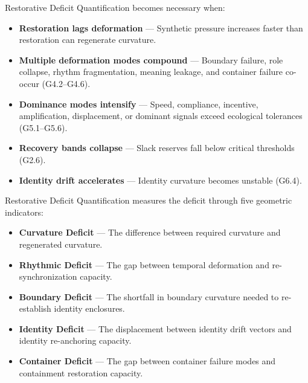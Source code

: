 \medskip

\noindent Restorative Deficit Quantification becomes necessary when:

\begin{itemize}[leftmargin=1.2cm]
    \item \textbf{Restoration lags deformation} — Synthetic pressure increases
    faster than restoration can regenerate curvature.

    \item \textbf{Multiple deformation modes compound} — Boundary failure,
    role collapse, rhythm fragmentation, meaning leakage, and container failure
    co-occur (G4.2–G4.6).

    \item \textbf{Dominance modes intensify} — Speed, compliance, incentive,
    amplification, displacement, or dominant signals exceed ecological tolerances
    (G5.1–G5.6).

    \item \textbf{Recovery bands collapse} — Slack reserves fall below critical
    thresholds (G2.6).

    \item \textbf{Identity drift accelerates} — Identity curvature becomes
    unstable (G6.4).
\end{itemize}

\medskip

\noindent Restorative Deficit Quantification measures the deficit through five
geometric indicators:

\begin{itemize}[leftmargin=1.2cm]
    \item \textbf{Curvature Deficit} — The difference between required curvature
    and regenerated curvature.

    \item \textbf{Rhythmic Deficit} — The gap between temporal deformation and
    re-synchronization capacity.

    \item \textbf{Boundary Deficit} — The shortfall in boundary curvature needed
    to re-establish identity enclosures.

    \item \textbf{Identity Deficit} — The displacement between identity drift
    vectors and identity re-anchoring capacity.

    \item \textbf{Container Deficit} — The gap between container failure modes
    and containment restoration capacity.
\end{itemize}

